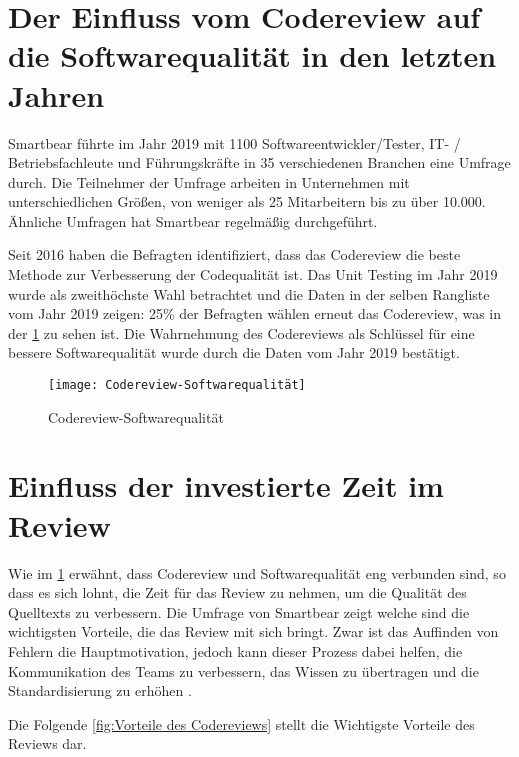 \section{Der Einfluss vom Codereview auf die Softwarequalität in den letzten Jahren}
\label{sec:Einfluss des Reviews}
Smartbear \cite{smartbear} führte im Jahr 2019 mit 1100 Softwareentwickler/Tester, IT- / Betriebsfachleute und Führungskräfte in 35 verschiedenen Branchen eine Umfrage durch. Die Teilnehmer der Umfrage arbeiten in Unternehmen mit unterschiedlichen Größen, von weniger als 25 Mitarbeitern bis zu über 10.000. Ähnliche Umfragen hat Smartbear regelmäßig durchgeführt.

Seit 2016 haben die Befragten identifiziert, dass das Codereview die beste Methode zur Verbesserung der Codequalität ist. Das Unit Testing im Jahr 2019 wurde als zweithöchste Wahl betrachtet und die Daten in der selben Rangliste vom Jahr 2019 zeigen: 25\% der Befragten wählen erneut das Codereview, was in der \cref{fig:Codereview-Softwarequalität} zu sehen ist. Die Wahrnehmung des Codereviews als Schlüssel für eine bessere Softwarequalität wurde durch die Daten vom Jahr 2019 bestätigt.

\begin{figure}[H]
	\centering
	\texttt{[image: Codereview-Softwarequalität]}
	\caption[Einfluss des Codereviews auf die Softwarequalität]{Codereview-Softwarequalität\\ \cite{smartbear}}
	\label{fig:Codereview-Softwarequalität}
\end{figure}

\section{Einfluss der investierte Zeit im Review}
\label{sec:reviewZeit}

Wie im \cref{sec:Einfluss des Reviews} erwähnt, dass Codereview und Softwarequalität eng verbunden sind, so dass es sich lohnt, die Zeit für das Review zu nehmen, um die Qualität des Quelltexts zu verbessern. Die Umfrage von Smartbear zeigt welche sind die wichtigsten Vorteile, die das Review mit sich bringt. Zwar ist das Auffinden von Fehlern die Hauptmotivation, jedoch kann dieser Prozess dabei helfen, die Kommunikation des Teams zu verbessern, das Wissen zu übertragen und die Standardisierung zu erhöhen \cite{smartbear}. 

Die Folgende \cref{fig:Vorteile des Codereviews} stellt die Wichtigste Vorteile des Reviews dar.

